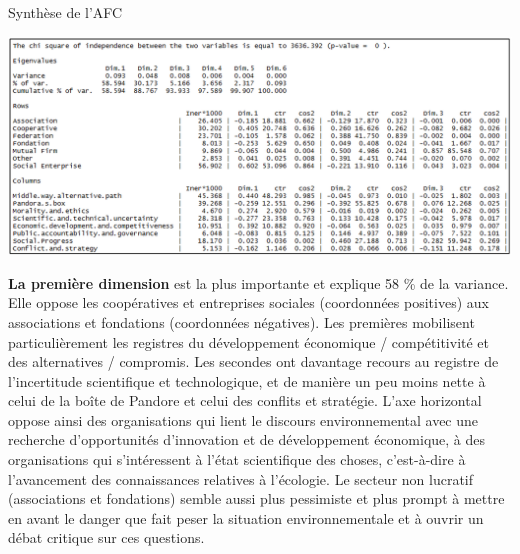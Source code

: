             \begin{encadre}
                \caption{Synthèse de l’AFC}
                \label{encadre:6afcsummary}
                \includegraphics[width = \textwidth]{fig/fig6.png}
            \end{encadre}


            \textbf{La première dimension} est la plus importante et explique 58 \% de la variance. Elle oppose les coopératives et entreprises sociales (coordonnées positives) aux associations et fondations (coordonnées négatives). Les premières mobilisent particulièrement les registres du développement économique / compétitivité et des alternatives / compromis. Les secondes ont davantage recours au registre de l’incertitude scientifique et technologique, et de manière un peu moins nette à celui de la boîte de Pandore et celui des conflits et stratégie. L’axe horizontal oppose ainsi des organisations qui lient le discours environnemental avec une recherche d’opportunités d’innovation et de développement économique, à des organisations qui s’intéressent à l’état scientifique des choses, c’est-à-dire à l’avancement des connaissances relatives à l’écologie. Le secteur non lucratif (associations et fondations) semble aussi plus pessimiste et plus prompt à mettre en avant le danger que fait peser la situation environnementale et à ouvrir un débat critique sur ces questions. \\

